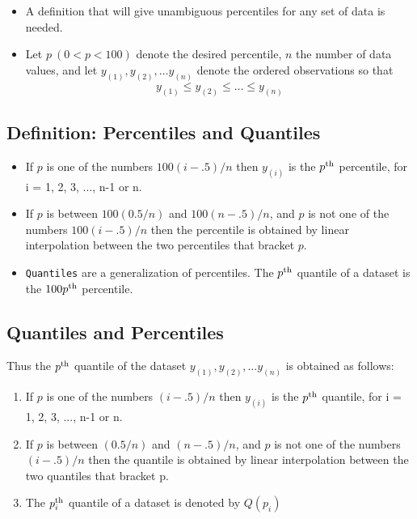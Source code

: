 \documentclass[
  letterpaper,
  DIV=11,
  numbers=noendperiod]{scrartcl}
\begin{document}
\begin{itemize}
\item
  A definition that will give unambiguous percentiles for any set of
  data is needed.
\item
  Let \(p\ (0 < p < 100)\) denote the desired percentile, \(n\) the
  number of data values, and let \(y_{(1)}, y_{(2)}, \ldots y_{(n)}\)
  denote the ordered observations so that
  \[y_{(1)} \le y_{(2)} \le \ldots  \le y_{(n)}\]
\end{itemize}

\subsection{Definition: Percentiles and
Quantiles}\label{definition-percentiles-and-quantiles}

\begin{itemize}
\item
  If \(p\) is one of the numbers \(100(i-.5)/n\) then \(y_{(i)}\) is the
  \(p^{\rm th}\) {percentile}, for i = 1, 2, 3, ..., n-1 or n.
\item
  If \(p\) is between \(100(0.5/n)\) and \(100(n-.5)/n\), and \(p\) is
  not one of the numbers \(100(i-.5)/n\) then the percentile is obtained
  by linear interpolation between the two percentiles that bracket
  \(p\).
\item
  \texttt{Quantiles} are a generalization of percentiles. The
  \(p^{\rm th}\) quantile of a dataset is the \(100p^{\rm th}\)
  percentile.
\end{itemize}

\subsection{Quantiles and
Percentiles}\label{quantiles-and-percentiles-3}

Thus the \(p^{\rm th}\) {quantile} of the dataset
\(y_{(1)}, y_{(2)}, \ldots y_{(n)}\) is obtained as follows:

\begin{enumerate}
\def\labelenumi{\arabic{enumi}.}
\item
  If \(p\) is one of the numbers \((i-.5)/n\) then \(y_{(i)}\) is the
  \(p^{\rm th}\) quantile, for i = 1, 2, 3, ..., n-1 or n.
\item
  If \(p\) is between \((0.5/n)\) and \((n-.5)/n\), and \(p\) is not one
  of the numbers \((i-.5)/n\) then the quantile is obtained by linear
  interpolation between the two quantiles that bracket p.
\item
  The \(p_i^{\rm th}\) quantile of a dataset is denoted by \(Q(p_i)\)
\end{enumerate}
\end{document}
